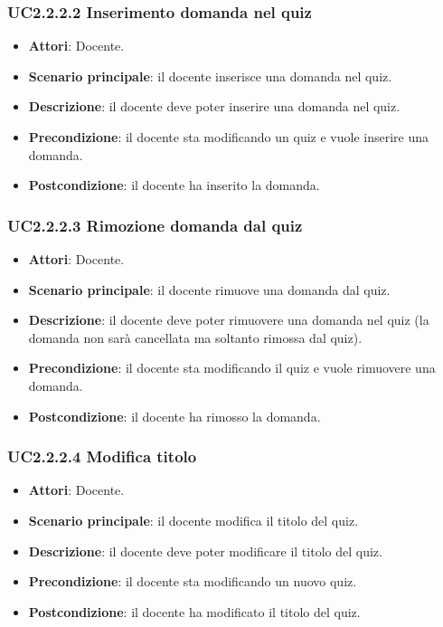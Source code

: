 \subsubsection{UC2.2.2.2 Inserimento domanda nel quiz}
\begin{itemize}
\item \textbf{Attori}: Docente.
\item \textbf{Scenario principale}: il docente inserisce una domanda nel quiz.
\item \textbf{Descrizione}: il docente deve poter inserire una domanda nel quiz.
\item \textbf{Precondizione}: il docente sta modificando un quiz e vuole inserire una domanda.
\item \textbf{Postcondizione}: il docente ha inserito la domanda.
\end{itemize}
\subsubsection{UC2.2.2.3 Rimozione domanda dal quiz}
\begin{itemize}
\item \textbf{Attori}: Docente.
\item \textbf{Scenario principale}: il docente rimuove una domanda dal quiz.
\item \textbf{Descrizione}: il docente deve poter rimuovere una domanda nel quiz (la domanda non sarà cancellata ma soltanto rimossa dal quiz).
\item \textbf{Precondizione}: il docente sta modificando il quiz e vuole rimuovere una domanda.
\item \textbf{Postcondizione}: il docente ha rimosso la domanda.
\end{itemize}
\subsubsection{UC2.2.2.4 Modifica titolo}
\begin{itemize}
\item \textbf{Attori}: Docente.
\item \textbf{Scenario principale}: il docente modifica il titolo del quiz.
\item \textbf{Descrizione}: il docente deve poter modificare il titolo del quiz.
\item \textbf{Precondizione}: il docente sta modificando un nuovo quiz.
\item \textbf{Postcondizione}: il docente ha modificato il titolo del quiz.
\end{itemize}
